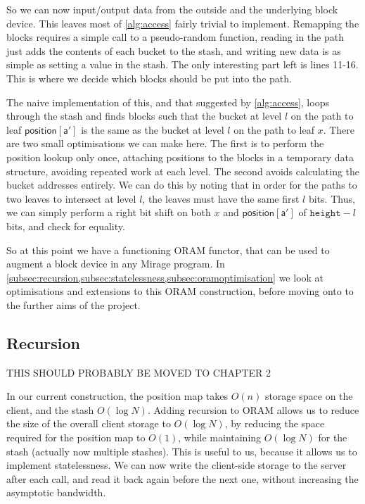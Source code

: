 \documentclass[12pt,a4paper,twoside,openright]{report}
\begin{document}
So we can now input/output data from the outside and the underlying block device. This leaves most of \cref{alg:access} fairly trivial to implement. Remapping the blocks requires a simple call to a pseudo-random function, reading in the path just adds the contents of each bucket to the stash, and writing new data is as simple as setting a value in the stash. The only interesting part left is lines 11-16. This is where we decide which blocks should be put into the path.

The naive implementation of this, and that suggested by \cref{alg:access}, loops through the stash and finds blocks such that the bucket at level $l$ on the path to leaf $\mathsf{position[a']}$ is the same as the bucket at level $l$ on the path to leaf $x$. There are two small optimisations we can make here. The first is to perform the position lookup only once, attaching positions to the blocks in a temporary data structure, avoiding repeated work at each level. The second avoids calculating the bucket addresses entirely. We can do this by noting that in order for the paths to two leaves to intersect at level $l$, the leaves must have the same first $l$ bits. Thus, we can simply perform a right bit shift on both $x$ and $\mathsf{position[a']}$ of $\mathtt{height} - l$ bits, and check for equality.

So at this point we have a functioning ORAM functor, that can be used to augment a block device in any Mirage program. In \cref{subsec:recursion,subsec:statelessness,subsec:oramoptimisation} we look at optimisations and extensions to this ORAM construction, before moving onto to the further aims of the project.


\subsection{Recursion}
\label{subsec:recursion}

THIS SHOULD PROBABLY BE MOVED TO CHAPTER 2

In our current construction, the position map takes $O(n)$ storage space on the client, and the stash $O(\log N)$. Adding recursion to ORAM allows us to reduce the size of the overall client storage to $O(\log N)$, by reducing the space required for the position map to $O(1)$, while maintaining $O(\log N)$ for the stash (actually now multiple stashes). This is useful to us, because it allows us to implement statelessness. We can now write the client-side storage to the server after each call, and read it back again before the next one, without increasing the asymptotic bandwidth.
\end{document}
